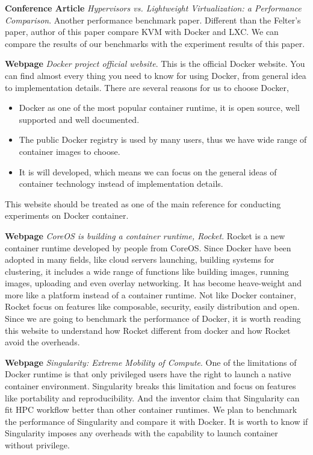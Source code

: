\documentclass{article}
\begin{document}
\medskip

\textbf{Conference Article} \emph{Hypervisors vs. Lightweight Virtualization: a Performance 
Comparison}\cite{morabito2015hypervisors}. Another performance benchmark paper. Different than 
the Felter's paper, author of this paper compare KVM with Docker and LXC. We can compare the 
results of our benchmarks with the experiment results of this paper.

\medskip

\textbf{Webpage} \emph{Docker project official website}\cite{dockerwb}. This is the official 
Docker website. You can find almost every thing you need to know for using Docker, from 
general idea to implementation details.  There are several reasons for us to choose Docker,
\begin{itemize}
    \item Docker as one of the most popular container runtime, it is open source, well supported 
        and well documented.
    \item The public Docker registry is used by many users, thus we have wide range of 
        container images to choose.
    \item It is will developed, which means we can focus on the general ideas of container technology
        instead of implementation details.
\end{itemize}
This website should be treated as one of the main reference for conducting experiments on Docker 
container.

\medskip

\textbf{Webpage} \emph{CoreOS is building a container runtime, Rocket}\cite{rocketwb}. Rocket is
a new container runtime developed by people from CoreOS. Since Docker have been adopted in many 
fields, like cloud servers launching, building systems for clustering, it includes a wide range
of functions like building images, running images, uploading and even overlay networking. It has 
become heave-weight and more like a platform instead of a container runtime. Not like Docker 
container, Rocket focus on features like composable, security, easily distribution and open. Since 
we are going to benchmark the performance of Docker, it is worth reading this website to understand
how Rocket different from docker and how Rocket avoid the overheads.

\medskip

\textbf{Webpage} \emph{Singularity: Extreme Mobility of Compute}\cite{singularity}. One of the 
limitations of Docker runtime is that only privileged users have the right to launch a native
container environment. Singularity breaks this limitation and focus on features like portability 
and reproducibility. And the inventor claim that Singularity can fit HPC workflow better 
than other container runtimes. We plan to benchmark the performance of Singularity and compare 
it with Docker. It is worth to know if Singularity imposes any overheads with the capability to 
launch container without privilege.  
\end{document}
